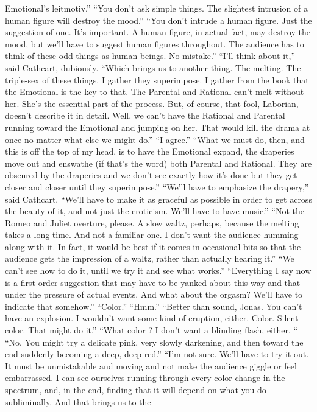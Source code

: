 \documentclass[a4paper,12pt]{article}
\begin{document}
Emotional’s leitmotiv.”
“You don’t ask simple things. The slightest intrusion of a human figure will destroy the mood.”
“You don’t intrude a human figure. Just the suggestion of one. It’s important. A human figure, in
actual fact, may destroy the mood, but we’ll have to suggest human figures throughout. The audience has to
think of these odd things as human beings. No mistake.”
“I’ll think about it,” said Cathcart, dubiously.
“Which brings us to another thing. The melting. The triple-sex of these things. I gather they
superimpose. I gather from the book that the Emotional is the key to that. The Parental and Rational can’t
melt without her. She’s the essential part of the process. But, of course, that fool, Laborian, doesn’t
describe it in detail. Well, we can’t have the Rational and Parental running toward the Emotional and
jumping on her. That would kill the drama at once no matter what else we might do.”
“I agree.”
“What we must do, then, and this is off the top of my head, is to have the Emotional expand, the
draperies move out and enswathe (if that’s the word) both Parental and Rational. They are obscured by the
draperies and we don’t see exactly how it’s done but they get closer and closer until they superimpose.”
“We’ll have to emphasize the drapery,” said Cathcart. “We’ll have to make it as graceful as
possible in order to get across the beauty of it, and not just the eroticism. We’ll have to have music.”
“Not the Romeo and Juliet overture, please. A slow waltz, perhaps, because the melting takes a
long time. And not a familiar one. I don’t want the audience humming along with it. In fact, it would be
best if it comes in occasional bits so that the audience gets the impression of a waltz, rather than actually
hearing it.”
“We can’t see how to do it, until we try it and see what works.”
“Everything I say now is a first-order suggestion that may have to be yanked about this way and
that under the pressure of actual events. And what about the orgasm? We’ll have to indicate that
somehow.”
“Color.”
“Hmm.”
“Better than sound, Jonas. You can’t have an explosion. I wouldn’t want some kind of eruption,
either. Color. Silent color. That might do it.”
“What color ? I don’t want a blinding flash, either. “
“No. You might try a delicate pink, very slowly darkening, and then toward the end suddenly
becoming a deep, deep red.”
“I’m not sure. We’ll have to try it out. It must be unmistakable and moving and not make the
audience giggle or feel embarrassed. I can see ourselves running through every color change in the
spectrum, and, in the end, finding that it will depend on what you do subliminally. And that brings us to the
\end{document}
